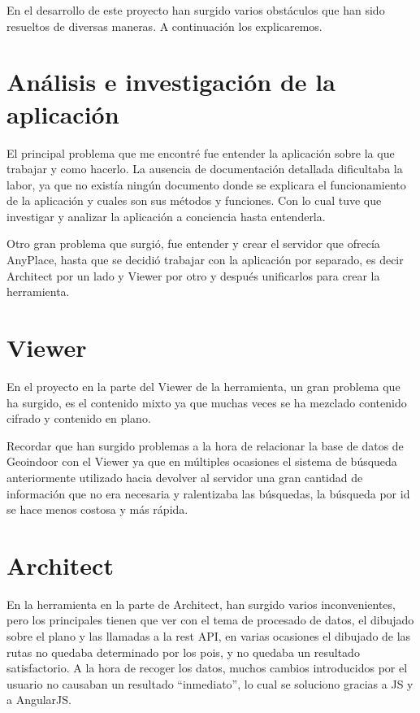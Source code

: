 
En el desarrollo de este proyecto han surgido varios obstáculos que han sido resueltos de diversas maneras. A continuación los explicaremos.

\section{Análisis e investigación de la aplicación }\label{analisis-investigacion}

El principal problema que me encontré fue entender la aplicación sobre la que trabajar y como hacerlo. La ausencia de documentación detallada dificultaba la labor, ya que no existía ningún documento donde se explicara el funcionamiento de la aplicación y cuales son sus métodos y funciones. Con lo cual tuve que investigar y analizar la aplicación a conciencia hasta entenderla.

Otro gran problema que surgió, fue entender y crear el servidor que ofrecía AnyPlace, hasta que se decidió trabajar con la aplicación por separado, es decir Architect por un lado y Viewer por otro y después unificarlos para crear la herramienta. 

\section{Viewer}\label{viewer}

En el proyecto en la parte del Viewer de la herramienta, un gran problema que ha surgido, es el contenido mixto ya que muchas veces se ha mezclado contenido cifrado y contenido en plano.

Recordar que han surgido problemas a la hora de relacionar la base de datos de Geoindoor con el Viewer ya que en múltiples ocasiones el sistema de búsqueda anteriormente utilizado hacia devolver al servidor una gran cantidad de información que no era necesaria y ralentizaba las búsquedas, la búsqueda por id se hace menos costosa y más rápida.

\section{Architect}\label{Architect} 

En la herramienta en la parte de Architect, han surgido varios inconvenientes, pero los principales tienen que ver con el tema de procesado de datos, el dibujado sobre el plano y las llamadas a la rest API, en varias ocasiones el dibujado de las rutas no quedaba determinado por los pois, y no quedaba un resultado satisfactorio. A la hora de recoger los datos, muchos cambios introducidos por el usuario no causaban un resultado ``inmediato'', lo cual se soluciono gracias a JS y a AngularJS.

